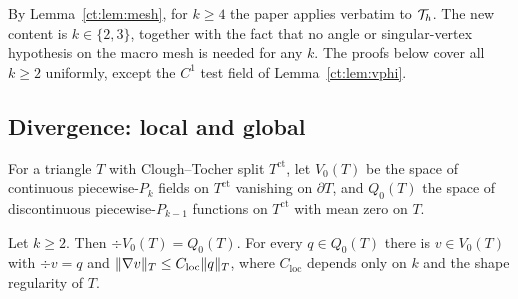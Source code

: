 By Lemma~\ref{ct:lem:mesh}, for $k\ge4$ the paper applies verbatim to $\mathcal T_h$. The new content is $k\in\{2,3\}$, together with the fact that no angle or singular-vertex hypothesis on the macro mesh is needed for any $k$. The proofs below cover all $k\ge2$ uniformly, except the $C^1$ test field of Lemma~\ref{ct:lem:vphi}.

\subsection{Divergence: local and global}

For a triangle $T$ with Clough--Tocher split $T^{\mathrm{ct}}$, let $V_0(T)$ be the space of continuous piecewise-$P_k$ fields on $T^{\mathrm{ct}}$ vanishing on $\partial T$, and $Q_0(T)$ the space of discontinuous piecewise-$P_{k-1}$ functions on $T^{\mathrm{ct}}$ with mean zero on $T$.

\begin{lemma}\label{ct:lem:local}
Let $k\ge2$. Then $\div V_0(T)=Q_0(T)$. For every $q\in Q_0(T)$ there is $v\in V_0(T)$ with $\div v=q$ and $\lVert \nabla v\rVert_T\le C_{\mathrm{loc}}\lVert q\rVert_T$, where $C_{\mathrm{loc}}$ depends only on $k$ and the shape regularity of $T$.
\end{lemma}

